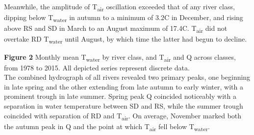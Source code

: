 \documentclass[notitlepage]{article}
\begin{document}
Meanwhile, the amplitude of T\textsubscript{air} oscillation exceeded that of any river class, dipping below T\textsubscript{water} in autumn to a minimum of 3.2\degree C in December, and rising above RS and SD in March to an August maximum of 17.4\degree C. T\textsubscript{air} did not overtake RD T\textsubscript{water} until August, by which time the latter had begun to decline.

\begin{center}
\end{center}

\noindent
\textbf{Figure 2} Monthly mean T\textsubscript{water} by river class, and T\textsubscript{air} and Q across classes, from 1978 to 2015. All depicted series represent discrete data. %
\\[\baselineskip]

The combined hydrograph of all rivers revealed two primary peaks, one beginning in late spring and the other extending from late autumn to early winter, with a prominent trough in late summer. Spring peak Q coincided noticeably with a separation in water temperature between SD and RS, while the summer trough coincided with separation of RD and T\textsubscript{air}. On average, November marked both the autumn peak in Q and the point at which T\textsubscript{air} fell below T\textsubscript{water}.
\end{document}
